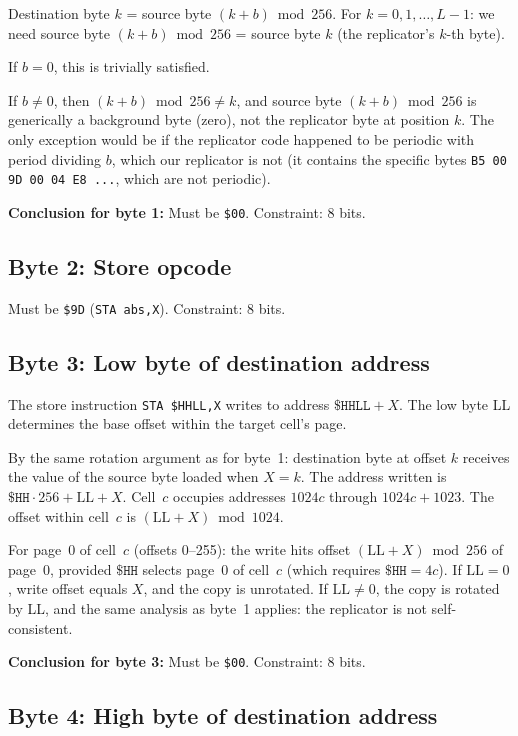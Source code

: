 \documentclass{article}
\newcommand{\hex}[1]{\texttt{\$#1}}
\newcommand{\opcode}[1]{\texttt{#1}}
\begin{document}
Destination byte $k$ = source byte $(k + b) \bmod 256$.
For $k = 0, 1, \ldots, L-1$: we need source byte $(k+b) \bmod 256$ =
source byte $k$ (the replicator's $k$-th byte).

If $b = 0$, this is trivially satisfied.

If $b \neq 0$, then $(k + b) \bmod 256 \neq k$, and source byte
$(k+b) \bmod 256$ is generically a background byte (zero), not the
replicator byte at position $k$. The only exception would be if the
replicator code happened to be periodic with period dividing $b$, which
our replicator is not (it contains the specific bytes \texttt{B5 00 9D
00 04 E8 ...}, which are not periodic).

\textbf{Conclusion for byte 1:} Must be \hex{00}. Constraint: 8 bits.

\subsection{Byte 2: Store opcode}

Must be \hex{9D} (\opcode{STA abs,X}).
Constraint: 8 bits.

\subsection{Byte 3: Low byte of destination address}

The store instruction \opcode{STA \$HH{LL},X} writes to address
$\hex{HHLL} + X$. The low byte LL determines the base offset within
the target cell's page.

By the same rotation argument as for byte~1: destination byte at
offset $k$ receives the value of the source byte loaded when $X = k$.
The address written is $\hex{HH}\cdot 256 + \mathrm{LL} + X$.
Cell~$c$ occupies addresses $1024c$ through $1024c + 1023$.
The offset within cell~$c$ is $(\mathrm{LL} + X) \bmod 1024$.

For page~0 of cell~$c$ (offsets 0--255): the write hits offset
$(\mathrm{LL} + X) \bmod 256$ of page~0, provided $\hex{HH}$ selects
page~0 of cell~$c$ (which requires $\hex{HH} = 4c$).
If $\mathrm{LL} = 0$, write offset equals $X$, and the copy is
unrotated. If $\mathrm{LL} \neq 0$, the copy is rotated by LL, and the
same analysis as byte~1 applies: the replicator is not self-consistent.

\textbf{Conclusion for byte 3:} Must be \hex{00}. Constraint: 8 bits.

\subsection{Byte 4: High byte of destination address}
\label{sec:byte4}
\end{document}
